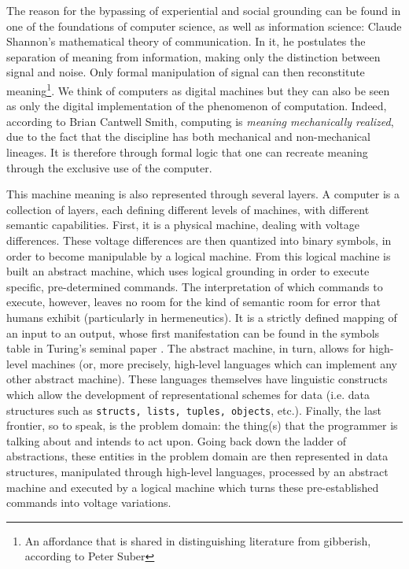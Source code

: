 The reason for the bypassing of experiential and social grounding can be found in one of the foundations of computer science, as well as information science: Claude Shannon's mathematical theory of communication. In it, he postulates the separation of meaning from information, making only the distinction between signal and noise. Only formal manipulation of signal can then reconstitute meaning\footnote{An affordance that is shared in distinguishing literature from gibberish, according to Peter Suber\citep{suber_what_1988}}. We think of computers as digital machines but they can also be seen as only the digital implementation of the phenomenon of computation. Indeed, according to Brian Cantwell Smith, computing is \emph{meaning mechanically realized}, due to the fact that the discipline has both mechanical and non-mechanical lineages\citep{smith_aos_2016}. It is therefore through formal logic that one can recreate meaning through the exclusive use of the computer.

This machine meaning is also represented through several layers. A computer is a collection of layers, each defining different levels of machines, with different semantic capabilities. First, it is a physical machine, dealing with voltage differences. These voltage differences are then quantized into binary symbols, in order to become manipulable by a logical machine. From this logical machine is built an abstract machine, which uses logical grounding in order to execute specific, pre-determined commands. The interpretation of which commands to execute, however, leaves no room for the kind of semantic room for error that humans exhibit (particularly in hermeneutics). It is a strictly defined mapping of an input to an output, whose first manifestation can be found in the symbols table in Turing's seminal paper \citep{turing_computable_1936}. The abstract machine, in turn, allows for high-level machines (or, more precisely, high-level languages which can implement any other abstract machine). These languages themselves have linguistic constructs which allow the development of representational schemes for data (i.e. data structures such as \lstinline{structs, lists, tuples, objects}, etc.). Finally, the last frontier, so to speak, is the problem domain: the thing(s) that the programmer is talking about and intends to act upon. Going back down the ladder of abstractions, these entities in the problem domain are then represented in data structures, manipulated through high-level languages, processed by an abstract machine and executed by a logical machine which turns these pre-established commands into voltage variations.

